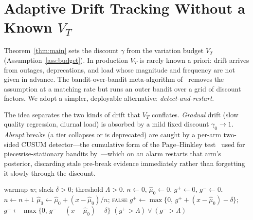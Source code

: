 \documentclass[11pt]{article}
\theoremstyle{definition}
\begin{document}
\section{Adaptive Drift Tracking Without a Known \texorpdfstring{$V_T$}{VT}}
\label{sec:adaptive}

Theorem~\ref{thm:main} sets the discount $\gamma$ from the variation budget
$V_T$ (Assumption~\ref{ass:budget}). In production $V_T$ is rarely known a
priori: drift arrives from outages, deprecations, and load whose magnitude and
frequency are not given in advance. The bandit-over-bandit meta-algorithm
of~\cite{cheung2019learning} removes the assumption at a matching rate but runs
an outer bandit over a grid of discount factors. We adopt a simpler, deployable
alternative: \emph{detect-and-restart}.

The idea separates the two kinds of drift that $V_T$ conflates.
\emph{Gradual} drift (slow quality regression, diurnal load) is absorbed by a
mild fixed discount $\gamma_0 \to 1$. \emph{Abrupt} breaks (a tier collapses or
is deprecated) are caught by a per-arm two-sided CUSUM detector---the
cumulative form of the Page--Hinkley test~\cite{page1954continuous,hinkley1971inference}
used for piecewise-stationary bandits by~\cite{liu2018change,cao2019nearly}---which
on an alarm restarts that arm's posterior, discarding stale pre-break evidence
immediately rather than forgetting it slowly through the discount.

\begin{algorithm}[h]
\caption{Two-sided CUSUM change detector (per arm)}
\label{alg:cusum}
\begin{algorithmic}[1]
\Require warmup $w$; slack $\delta>0$; threshold $\Lambda>0$.
\State $n \gets 0$, $\hat{\mu}_0 \gets 0$, $g^+ \gets 0$, $g^- \gets 0$.
 
    \State $n \gets n+1$
     \quad $\hat{\mu}_0 \gets \hat{\mu}_0 + (x-\hat{\mu}_0)/n$; \quad \Return \textsc{false} 
    \EndIf
    \State $g^+ \gets \max\{0,\, g^+ + (x-\hat{\mu}_0) - \delta\}$; \quad $g^- \gets \max\{0,\, g^- - (x-\hat{\mu}_0) - \delta\}$
    \State \Return $(g^+ > \Lambda) \vee (g^- > \Lambda)$
\EndFunction
\end{algorithmic}
\end{algorithm}
\end{document}
